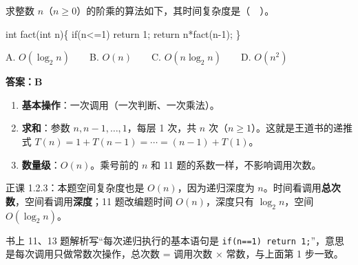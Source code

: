 \documentclass[10.5pt,a4paper,oneside]{article}
\newcommand{\hlred}[1]{\textcolor{wdred}{\bfseries #1}}
\providecommand{\tightlist}{\setlength{\itemsep}{2pt}\setlength{\parskip}{0pt}}
\newenvironment{Shaded}{}{}
\newcommand{\ControlFlowTok}[1]{\textcolor[rgb]{0.12,0.31,0.71}{#1}}
\newcommand{\DataTypeTok}[1]{\textcolor[rgb]{0.12,0.31,0.71}{#1}}
\newcommand{\DecValTok}[1]{\textcolor[rgb]{0.77,0.35,0.07}{#1}}
\newcommand{\NormalTok}[1]{#1}
\newcommand{\OperatorTok}[1]{\textcolor[rgb]{0.20,0.20,0.20}{#1}}
\begin{document}
\begin{questionbox}[13 · 2012 统考真题]

求整数 \(n\)（\(n\ge 0\)）的阶乘的算法如下，其时间复杂度是（　）。

\begin{Shaded}
\begin{Highlighting}[]
\DataTypeTok{int}\NormalTok{ fact}\OperatorTok{(}\DataTypeTok{int}\NormalTok{ n}\OperatorTok{)\{}
    \ControlFlowTok{if}\OperatorTok{(}\NormalTok{n}\OperatorTok{\textless{}=}\DecValTok{1}\OperatorTok{)} \ControlFlowTok{return} \DecValTok{1}\OperatorTok{;}
    \ControlFlowTok{return}\NormalTok{ n}\OperatorTok{*}\NormalTok{fact}\OperatorTok{(}\NormalTok{n}\OperatorTok{{-}}\DecValTok{1}\OperatorTok{);}
\OperatorTok{\}}
\end{Highlighting}
\end{Shaded}

A. \(O(\log_2 n)\)　　B. \(O(n)\)　　C. \(O(n\log_2 n)\)　　D.
\(O(n^2)\)

\end{questionbox}

\hlred{\textbf{答案：B}}

\begin{enumerate}
\def\labelenumi{\arabic{enumi}.}
\tightlist
\item
  \textbf{基本操作}：一次调用（一次判断、一次乘法）。
\item
  \textbf{求和}：参数 \(n,n-1,\dots,1\)，每层 1 次，共 \(n\)
  次（\(n\ge1\)）。这就是王道书的递推式
  \(T(n)=1+T(n-1)=\cdots=(n-1)+T(1)\)。
\item
  \textbf{数量级}：\(O(n)\)。乘号前的 \(n\) 和 11
  题的系数一样，不影响调用次数。
\end{enumerate}

\begin{recallbox}

正课 1.2.3：本题空间复杂度也是 \(O(n)\)，因为递归深度为
\(n\)。时间看调用\textbf{总次数}，空间看调用\textbf{深度}；11
题改编题时间 \(O(n)\)，深度只有 \(\log_2 n\)，空间 \(O(\log_2 n)\)。

\end{recallbox}

\begin{fixbox}

书上 11、13 题解析写“每次递归执行的基本语句是
\texttt{if(n==1)\ return\ 1;}”，意思是每次调用只做常数次操作，总次数 =
调用次数 × 常数，与上面第 1 步一致。

\end{fixbox}
\end{document}
